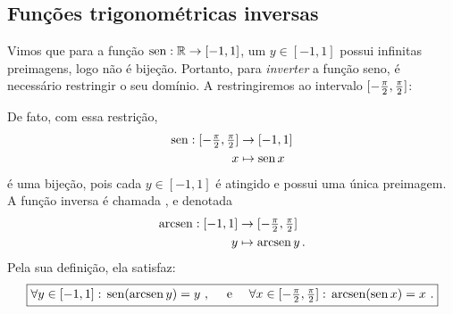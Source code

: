 \subsection{Funções trigonométricas inversas}\label{Sec:Functriginversas}
Vimos que para a função $\operatorname{sen}: \mathbb{R}\to [-1,1]$, 
um $y\in [-1,1]$ possui infinitas preimagens, logo não é bijeção. 
Portanto, para \emph{inverter} a função seno, é necessário restringir o seu domínio. A restringiremos ao intervalo  $[-\tfrac{\pi}{2},\tfrac{\pi}{2}]$:
\begin{center}
\begin{bmlimage}\end{bmlimage}
\end{center}
De fato, com essa restrição,
\begin{align*}
\operatorname{sen} :[-\tfrac{\pi}{2},\tfrac{\pi}{2}]&\to [-1,1]\\
x&\mapsto \operatorname{sen} x
\end{align*}
é uma bijeção, pois cada $y\in [-1,1]$ é atingido e possui uma única preimagem. A função
inversa é chamada \index{$\arcsen$}, e denotada
\begin{align*}
\operatorname{arcsen} :[-1,1]&\to [-\tfrac{\pi}{2},\tfrac{\pi}{2}]\\
y&\mapsto \operatorname{arcsen} y\,.
\end{align*}
Pela sua definição, ela satisfaz:
\begin{equation}
\boxed{ \forall y\in [-1,1]:\,\operatorname{sen} (\operatorname{arcsen} y)=y\,\,,\quad\text{ e } 
\quad\forall x\in [-\tfrac{\pi}{2},\tfrac{\pi}{2}]:\,\operatorname{arcsen}(\operatorname{sen}
x)=x\,\,.}
\end{equation}

